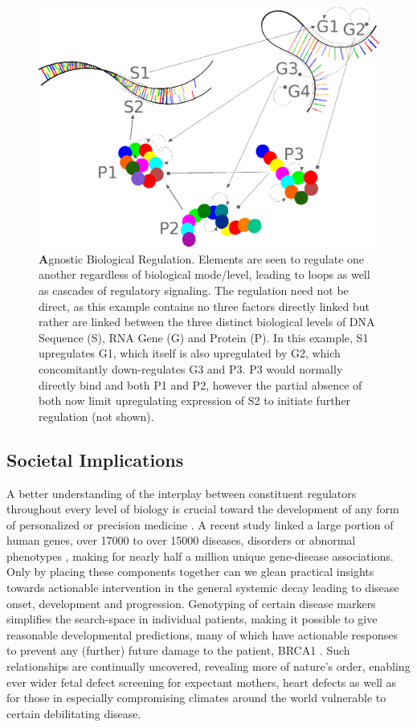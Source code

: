 \begin{figure}%
\centering
\includegraphics[width=1\linewidth]{2/DNA2.eps}
\caption{{\textbf Agnostic Biological Regulation.} Elements are seen to regulate one another regardless of biological mode/level, leading to loops as well as cascades of regulatory signaling. The regulation need not be direct, as this example contains no three factors directly linked but rather are linked between the three distinct biological levels of DNA Sequence (S), RNA Gene (G) and Protein (P). In this example, S1 upregulates G1, which itself is also upregulated by G2, which concomitantly down-regulates G3 and P3. P3 would normally directly bind and  both P1 and P2, however the partial absence of both now limit upregulating expression of S2 to initiate further regulation (not shown).
}
\label{fig:DNA}
\end{figure}


\subsection{Societal Implications}
\label{sec:practical}
A better understanding of the interplay between constituent regulators throughout every level of biology is crucial toward the development of any form of personalized or precision medicine \citep{barabasi2011network}. A recent study linked a large portion of human genes, over 17000 to over 15000 diseases, disorders or abnormal phenotypes \citep{pinero2015disgenet}, making for nearly half a million unique gene-disease associations. Only by placing these components together can we glean practical insights towards actionable intervention in the general systemic decay leading to disease onset, development and progression. Genotyping of certain disease markers simplifies the search-space in individual patients, making it possible to give reasonable developmental predictions, many of which have actionable responses to prevent any (further) future damage to the patient, \ie BRCA1 \citep{lerman1996brca1}. Such relationships are continually uncovered, revealing more of nature's order, enabling ever wider fetal defect screening for expectant mothers, \ie heart defects \citep{hyett1999using} as well as for those in especially compromising climates around the world vulnerable to certain debilitating disease.

